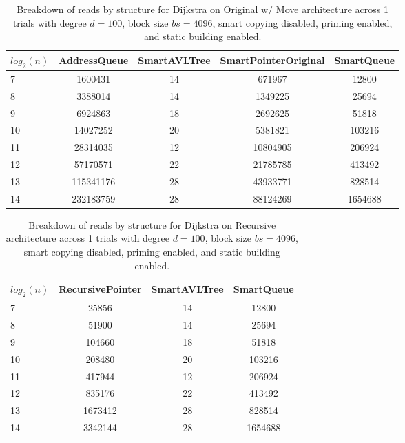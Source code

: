 \begin{table}[]
\centering
\begin{tabular}{|l|c|c|c|c|}
$log_2(n)$ & AddressQueue & SmartAVLTree & SmartPointerOriginal & SmartQueue \\ \hline
7 & 1600431 & 14 & 671967 & 12800 \\ \hline
8 & 3388014 & 14 & 1349225 & 25694 \\ \hline
9 & 6924863 & 18 & 2692625 & 51818 \\ \hline
10 & 14027252 & 20 & 5381821 & 103216 \\ \hline
11 & 28314035 & 12 & 10804905 & 206924 \\ \hline
12 & 57170571 & 22 & 21785785 & 413492 \\ \hline
13 & 115341176 & 28 & 43933771 & 828514 \\ \hline
14 & 232183759 & 28 & 88124269 & 1654688 \\ \hline
\end{tabular}
\caption{Breakdown of reads by structure for Dijkstra on Original w/ Move architecture across 1 trials with degree $d=100$, block size $bs=4096$, smart copying disabled, priming enabled, and static building enabled.}
    \label{tab:reads_by_structure_dijkstra_d100_bs4096_trials1_copiesfalse_primetrue_staticinsertiontrue_ptoriginal_movetrue}
\end{table}

\begin{table}[]
\centering
\begin{tabular}{|l|c|c|c|}
$log_2(n)$ & RecursivePointer & SmartAVLTree & SmartQueue \\ \hline
7 & 25856 & 14 & 12800 \\ \hline
8 & 51900 & 14 & 25694 \\ \hline
9 & 104660 & 18 & 51818 \\ \hline
10 & 208480 & 20 & 103216 \\ \hline
11 & 417944 & 12 & 206924 \\ \hline
12 & 835176 & 22 & 413492 \\ \hline
13 & 1673412 & 28 & 828514 \\ \hline
14 & 3342144 & 28 & 1654688 \\ \hline
\end{tabular}
\caption{Breakdown of reads by structure for Dijkstra on Recursive architecture across 1 trials with degree $d=100$, block size $bs=4096$, smart copying disabled, priming enabled, and static building enabled.}
    \label{tab:reads_by_structure_dijkstra_d100_bs4096_trials1_copiesfalse_primetrue_staticinsertiontrue_ptrecursive_movetrue}
\end{table}

